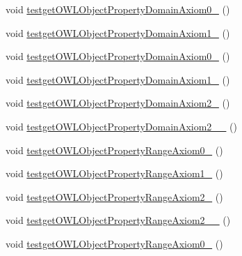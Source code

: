 \begin{DoxyCompactItemize}
\item 
void \hyperlink{classorg_1_1semanticweb_1_1owlapi_1_1api_1_1test_1_1_null_check_test_case_a00ea145d61bcfdbd19aa596350b860de}{testget\-O\-W\-L\-Object\-Property\-Domain\-Axiom0\-\_} ()
\item 
void \hyperlink{classorg_1_1semanticweb_1_1owlapi_1_1api_1_1test_1_1_null_check_test_case_a24ded65e982958dfb99c037ec5f0e7e7}{testget\-O\-W\-L\-Object\-Property\-Domain\-Axiom1\-\_} ()
\item 
void \hyperlink{classorg_1_1semanticweb_1_1owlapi_1_1api_1_1test_1_1_null_check_test_case_adcaf6913d29031069813508ba596bfb7}{testget\-O\-W\-L\-Object\-Property\-Domain\-Axiom0\-\_} ()
\item 
void \hyperlink{classorg_1_1semanticweb_1_1owlapi_1_1api_1_1test_1_1_null_check_test_case_a3d0fc331ca8be890fa9c3554be2ee472}{testget\-O\-W\-L\-Object\-Property\-Domain\-Axiom1\-\_} ()
\item 
void \hyperlink{classorg_1_1semanticweb_1_1owlapi_1_1api_1_1test_1_1_null_check_test_case_a33c9f1ae50b8e1c6126e765ee8ecd9a0}{testget\-O\-W\-L\-Object\-Property\-Domain\-Axiom2\-\_} ()
\item 
void \hyperlink{classorg_1_1semanticweb_1_1owlapi_1_1api_1_1test_1_1_null_check_test_case_a83cb6cd8ee320c2331fb6337c85cc02d}{testget\-O\-W\-L\-Object\-Property\-Domain\-Axiom2\-\_\-\_} ()
\item 
void \hyperlink{classorg_1_1semanticweb_1_1owlapi_1_1api_1_1test_1_1_null_check_test_case_ad69dfb4b68635114372a98c21de574d0}{testget\-O\-W\-L\-Object\-Property\-Range\-Axiom0\-\_} ()
\item 
void \hyperlink{classorg_1_1semanticweb_1_1owlapi_1_1api_1_1test_1_1_null_check_test_case_aa71bb17836b3c10d67faae41824cafc2}{testget\-O\-W\-L\-Object\-Property\-Range\-Axiom1\-\_} ()
\item 
void \hyperlink{classorg_1_1semanticweb_1_1owlapi_1_1api_1_1test_1_1_null_check_test_case_adb638ec4aefe3c9afbe698791deb1f41}{testget\-O\-W\-L\-Object\-Property\-Range\-Axiom2\-\_} ()
\item 
void \hyperlink{classorg_1_1semanticweb_1_1owlapi_1_1api_1_1test_1_1_null_check_test_case_a8f25478f6e92f8d9ca6a1cfc4f6459b9}{testget\-O\-W\-L\-Object\-Property\-Range\-Axiom2\-\_\-\_} ()
\item 
void \hyperlink{classorg_1_1semanticweb_1_1owlapi_1_1api_1_1test_1_1_null_check_test_case_a00b5035d0117f05029e119166fbdf6a0}{testget\-O\-W\-L\-Object\-Property\-Range\-Axiom0\-\_} ()
\item 

\end{DoxyCompactItemize}
